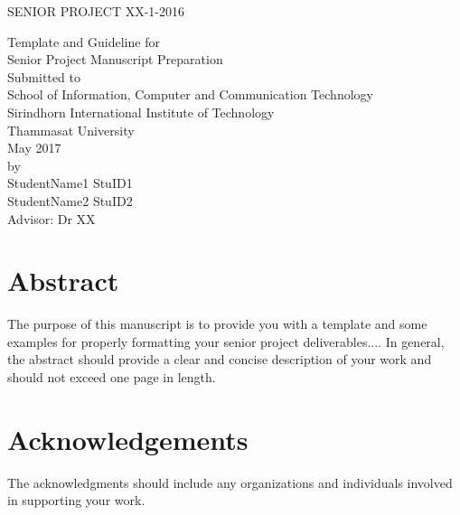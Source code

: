 \documentclass[12pt, a4paper]{report}
\begin{document}
\begin{center}

\large 
\vspace*{2cm}

SENIOR PROJECT XX-1-2016\\[2cm]

\LARGE


Template and Guideline for \\ Senior Project Manuscript Preparation\\[2cm]
\large
Submitted to \\[1cm]
School of Information, Computer and Communication Technology \\
Sirindhorn International Institute of Technology \\
Thammasat University \\[2cm]
May 2017 \\[3cm]
by \\[1cm]
StudentName1   StuID1 \\
StudentName2   StuID2\\[2cm]
Advisor: Dr XX
\end{center}


\newpage
\pagestyle{plain}
\onehalfspace

\chapter*{Abstract} 
The purpose of this manuscript is to provide you with a template and some examples for properly formatting your senior project deliverables.... In general, the abstract should provide a clear and concise description of your work and should not exceed one page in length. 


\newpage

\chapter*{Acknowledgements} 

The acknowledgments should include any organizations and individuals involved in supporting your work.

\newpage


\tableofcontents

\newpage
\end{document}
